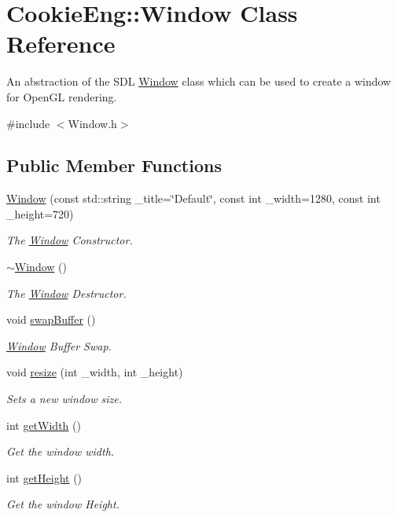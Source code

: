 \hypertarget{class_cookie_eng_1_1_window}{}\section{Cookie\+Eng\+:\+:Window Class Reference}
\label{class_cookie_eng_1_1_window}


An abstraction of the S\+DL \hyperlink{class_cookie_eng_1_1_window}{Window} class which can be used to create a window for Open\+GL rendering.  




{\ttfamily \#include $<$Window.\+h$>$}

\subsection*{Public Member Functions}
\begin{DoxyCompactItemize}
\item 
\hyperlink{class_cookie_eng_1_1_window_ada0459ccc0ba0254bb9517cce1cf94bb}{Window} (const std\+::string \+\_\+title=\char`\"{}Default\char`\"{}, const int \+\_\+width=1280, const int \+\_\+height=720)
\begin{DoxyCompactList}\small\item\em The \hyperlink{class_cookie_eng_1_1_window}{Window} Constructor. \end{DoxyCompactList}\item 
\hyperlink{class_cookie_eng_1_1_window_af81149525fe716874b5637cbef63c78f}{$\sim$\+Window} ()
\begin{DoxyCompactList}\small\item\em The \hyperlink{class_cookie_eng_1_1_window}{Window} Destructor. \end{DoxyCompactList}\item 
void \hyperlink{class_cookie_eng_1_1_window_aebe5875df57a0ab57f3cc9da256dd439}{swap\+Buffer} ()
\begin{DoxyCompactList}\small\item\em \hyperlink{class_cookie_eng_1_1_window}{Window} Buffer Swap. \end{DoxyCompactList}\item 
void \hyperlink{class_cookie_eng_1_1_window_a6fccbbff3e4efa69e6b94a57f7f99b31}{resize} (int \+\_\+width, int \+\_\+height)
\begin{DoxyCompactList}\small\item\em Sets a new window size. \end{DoxyCompactList}\item 
int \hyperlink{class_cookie_eng_1_1_window_a41425d62b39dea360e3618425cbb12f0}{get\+Width} ()
\begin{DoxyCompactList}\small\item\em Get the window width. \end{DoxyCompactList}\item 
int \hyperlink{class_cookie_eng_1_1_window_a5c4c31ce29ff60da053ea44138ba2882}{get\+Height} ()
\begin{DoxyCompactList}\small\item\em Get the window Height. \end{DoxyCompactList}\end{DoxyCompactItemize}
